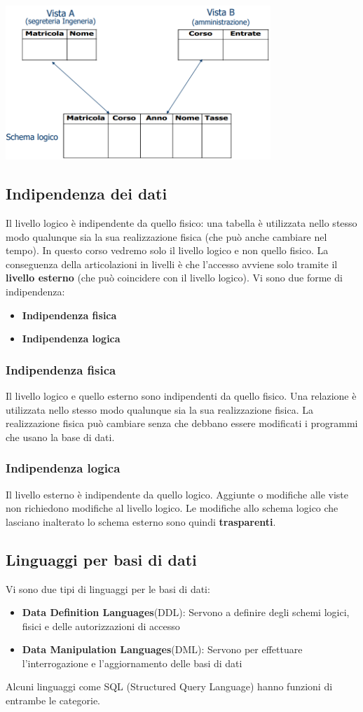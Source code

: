 \documentclass[12pt]{article}
\begin{document}
\begin{center}
    \includegraphics[width = 0.75\textwidth]{Images/9.PNG}
\end{center}
\subsection{Indipendenza dei dati}
Il livello logico è indipendente da quello fisico: una tabella è utilizzata nello stesso modo qualunque sia la sua realizzazione fisica (che può anche cambiare nel tempo).
In questo corso vedremo solo il livello logico e non quello fisico.
La conseguenza della articolazioni in livelli è che l'accesso avviene solo tramite il \textbf{livello esterno} (che può coincidere con il livello logico).
Vi sono due forme di indipendenza:
\begin{itemize}
    \item \textbf{Indipendenza fisica}
    \item \textbf{Indipendenza logica}
\end{itemize}
\subsubsection{Indipendenza fisica}
Il livello logico e quello esterno sono indipendenti da quello fisico. Una relazione è utilizzata nello stesso modo qualunque sia la sua realizzazione fisica.
La realizzazione fisica può cambiare senza che debbano essere modificati i programmi che usano la base di dati.
\subsubsection{Indipendenza logica}
Il livello esterno è indipendente da quello logico. Aggiunte o modifiche alle viste non richiedono modifiche al livello logico.
Le modifiche allo schema logico che lasciano inalterato lo schema esterno sono quindi \textbf{trasparenti}.
\subsection{Linguaggi per basi di dati}
Vi sono due tipi di linguaggi per le basi di dati:
\begin{itemize}
    \item \textbf{Data Definition Languages}(DDL): Servono a definire degli schemi logici, fisici e delle autorizzazioni di accesso
    \item \textbf{Data Manipulation Languages}(DML): Servono per effettuare l'interrogazione e l'aggiornamento delle basi di dati 
\end{itemize}
Alcuni linguaggi come SQL (Structured Query Language) hanno funzioni di entrambe le categorie.
\end{document}
